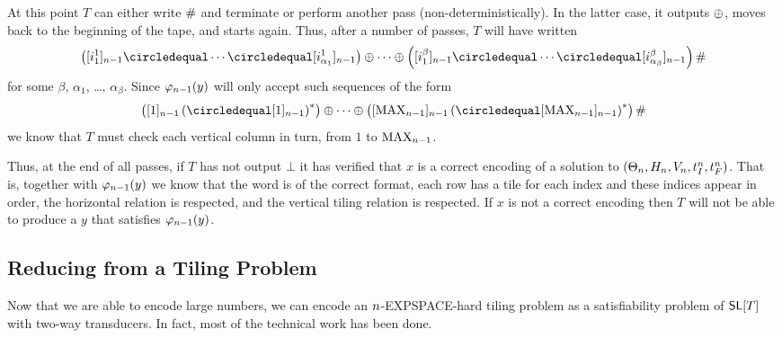\begin{itemize}
    At this point $T$ can either write $\#$ and terminate or perform another pass (non-deterministically).
    In the latter case, it outputs $\oplus$, moves back to the beginning of the tape, and starts again.
    Thus, after a number of passes, $T$ will have written
    \[
        \brac{
            \tenc{\expheight-1}{i^1_1}
            \numeq
            \cdots
            \numeq
            \tenc{\expheight-1}{i^1_{\alpha_1}}
        }
        \numplus
        \cdots
        \numplus
        \brac{
            \tenc{\expheight-1}{i^\beta_1}
            \numeq
            \cdots
            \numeq
            \tenc{\expheight-1}{i^\beta_{\alpha_\beta}}
        }
        \numsep
    \]
    for some $\beta$, $\alpha_1$, \ldots, $\alpha_\beta$.
    Since
    ${\varphi_{n-1}}\mathord{\left( y \right)}$
    will only accept such sequences of the form
    \[
        \brac{
            \tenc{\expheight-1}{1}
            \brac{
                \numeq \tenc{\expheight-1}{1}
            }^\ast
        }
        \numplus
        \cdots
        \numplus
        \brac{
            \tenc{\expheight-1}{\nmax{\expheight-1}}
            \brac{
                \numeq \tenc{\expheight-1}{\nmax{\expheight-1}}
            }^\ast
        }
        \numsep
    \]
    we know that $T$ must check each vertical column in turn, from $1$ to
    $\text{MAX}_{n-1}$.
\end{itemize}

Thus, at the end of all passes, if $T$ has not output $\bot$ it has verified that $x$ is a correct encoding of a solution to
$\left( \Theta_{n},
      H_{n},
      V_{n},
      t_I^{n},
      t_F^{n} \right)$.
That is, together with
${\varphi_{n-1}}\mathord{\left( y \right)}$
we know that
    the word is of the correct format,
    each row has a tile for each index and these indices appear in order,
    the horizontal relation is respected, and
    the vertical tiling relation is respected.
If $x$ is not a correct encoding then $T$ will not be able to produce a $y$ that satisfies
${\varphi_{n-1}}\mathord{\left( y \right)}$.


\subsection{Reducing from a Tiling Problem}

Now that we are able to encode large numbers, we can encode an $n$-EXPSPACE-hard tiling problem as a satisfiability problem of $\mathsf{SL}[T]$ with two-way transducers.
In fact, most of the technical work has been done.

